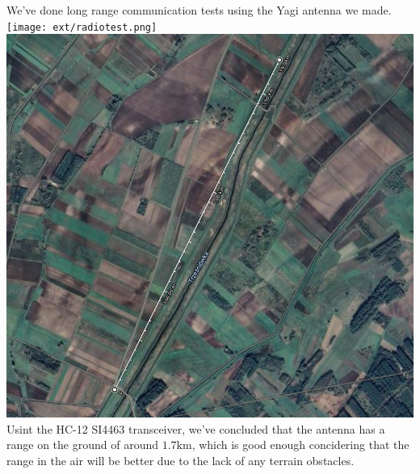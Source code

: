 \documentclass[class=report, crop=false]{standalone}
\begin{document}
We've done long range communication tests using the Yagi antenna we made.
\texttt{[image: ext/radiotest.png]}
\includegraphics[width=\columnwidth]{ext/radiomap.png}
Usint the HC-12 SI4463 transceiver, we've concluded that the antenna has a range on the ground of around $1.7\text{km}$, which is good enough concidering that the range in the air will be better due to the lack of any terrain obstacles. 
\end{document}
